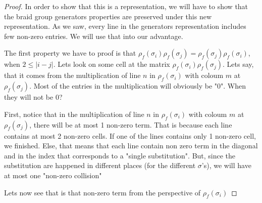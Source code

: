 \documentclass{article}
\begin{document}
\begin{proof}
In order to show that this is a representation, we will have to show that the braid group generators properties are preserved under this new representation. As we saw, every line in the generators representation includes few non-zero entries. We will use that into our advantage.

The first property we have to proof is that $\rho_{f}(\sigma_{i})\rho_{f}(\sigma_{j}) = \rho_{f}(\sigma_{j})\rho_{f}(\sigma_{i})$, when $2 \leq |i - j| $. Lets look on some cell at the matrix $\rho_{f}(\sigma_{i})\rho_{f}(\sigma_{j})$. Lets say, that it comes from the multiplication of line $n$ in $\rho_{f}(\sigma_{i})$ with coloum $m$ at $\rho_{f}(\sigma_{j})$. 
Most of the entries in the multiplication will obviously be "0". When they will not be 0?

First, notice that in the multiplication of line $n$ in $\rho_{f}(\sigma_{i})$ with coloum $m$ at $\rho_{f}(\sigma_{j})$, there will be at most 1 non-zero term. That is because each line contains at most 2 non-zero cells. If one of the lines contains only 1 non-zero cell, we finished. Else, that means that each line contain non zero term in the diagonal and in the index that corresponds to a "single substitution". But, since the substitution are happened in different places (for the different $\sigma$'s), we will have at most one "non-zero collision"

Lets now see that is that non-zero term from the perspective of $\rho_{f}(\sigma_{i})$


\end{proof}
\end{document}
